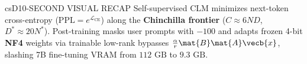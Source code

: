 \documentclass[../../../../master.tex]{subfiles}
\begin{document}
\begin{cscolumns}
\begin{cscard}{csD}{10-SECOND VISUAL RECAP}
  \sffamily\footnotesize
  Self-supervised CLM minimizes next-token cross-entropy ($\mathrm{PPL}=e^{\mathcal{L}_{\mathrm{CE}}}$) along the \textbf{Chinchilla frontier} ($C\approx 6ND$, $D^*\approx 20N^*$). Post-training masks user prompts with $-100$ and adapts frozen 4-bit \textbf{NF4} weights via trainable low-rank bypasses $\frac{\alpha}{r}\mat{B}\mat{A}\vecb{x}$, slashing 7B fine-tuning VRAM from $112\text{ GB}$ to $9.3\text{ GB}$.
\end{cscard}
\end{cscolumns}

\csend
\end{document}
